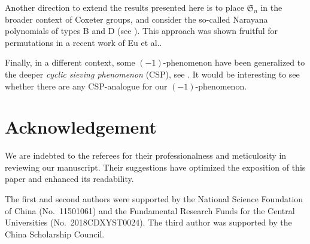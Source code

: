 \documentclass[12pt,reqno]{amsart}
\numberwithin{equation}{section}
\theoremstyle{plain}
\theoremstyle{definition}
\def\S{\mathfrak{S}}
\begin{document}
Another direction to extend the results presented here is to place $\S_n$ in the broader context of Coxeter groups, and consider the so-called  Narayana polynomials of types B and D (see \cite[Theorems 2.32 and 2.33]{Ath}). This approach was shown fruitful for permutations in a recent work of Eu et al.\cite{EFHL}.

Finally, in a different context,
 some $(-1)$-phenomenon have been generalized to the deeper \emph{cyclic sieving phenomenon} (CSP), see \cite{RSW, Sag}.
It would be interesting to see whether there are any
CSP-analogue for our $(-1)$-phenomenon.

\section*{Acknowledgement}
We are indebted to the referees for their professionalness and meticulosity in reviewing our manuscript. Their suggestions have optimized the exposition of this paper and enhanced its readability.

The first and second authors were supported by the National Science Foundation of China (No.~11501061) and the Fundamental Research Funds for the Central Universities (No.~2018CDXYST0024). The third author was supported by the China Scholarship Council.
\end{document}
